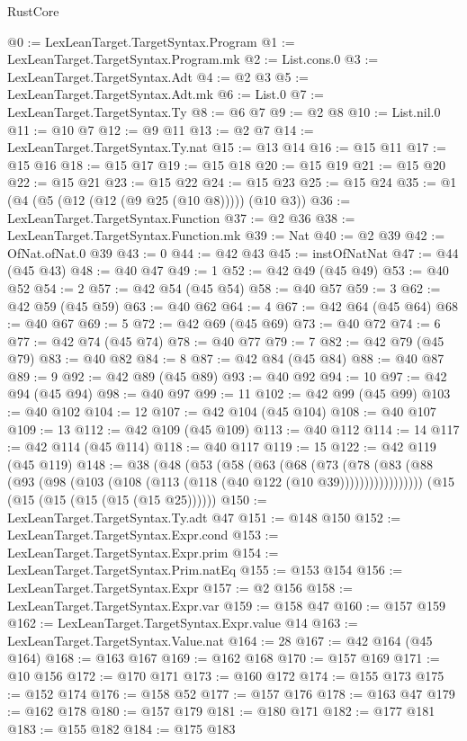 \begin{lexlean}{RustCore}
\begin{coremodule}
@0 := LexLeanTarget.TargetSyntax.Program
@1 := LexLeanTarget.TargetSyntax.Program.mk
@2 := List.cons.{0}
@3 := LexLeanTarget.TargetSyntax.Adt
@4 := @2 @3
@5 := LexLeanTarget.TargetSyntax.Adt.mk
@6 := List.{0}
@7 := LexLeanTarget.TargetSyntax.Ty
@8 := @6 @7
@9 := @2 @8
@10 := List.nil.{0}
@11 := @10 @7
@12 := @9 @11
@13 := @2 @7
@14 := LexLeanTarget.TargetSyntax.Ty.nat
@15 := @13 @14
@16 := @15 @11
@17 := @15 @16
@18 := @15 @17
@19 := @15 @18
@20 := @15 @19
@21 := @15 @20
@22 := @15 @21
@23 := @15 @22
@24 := @15 @23
@25 := @15 @24
@35 := @1 (@4 (@5 (@12 (@12 (@9 @25 (@10 @8))))) (@10 @3))
@36 := LexLeanTarget.TargetSyntax.Function
@37 := @2 @36
@38 := LexLeanTarget.TargetSyntax.Function.mk
@39 := Nat
@40 := @2 @39
@42 := OfNat.ofNat.{0} @39
@43 := 0
@44 := @42 @43
@45 := instOfNatNat
@47 := @44 (@45 @43)
@48 := @40 @47
@49 := 1
@52 := @42 @49 (@45 @49)
@53 := @40 @52
@54 := 2
@57 := @42 @54 (@45 @54)
@58 := @40 @57
@59 := 3
@62 := @42 @59 (@45 @59)
@63 := @40 @62
@64 := 4
@67 := @42 @64 (@45 @64)
@68 := @40 @67
@69 := 5
@72 := @42 @69 (@45 @69)
@73 := @40 @72
@74 := 6
@77 := @42 @74 (@45 @74)
@78 := @40 @77
@79 := 7
@82 := @42 @79 (@45 @79)
@83 := @40 @82
@84 := 8
@87 := @42 @84 (@45 @84)
@88 := @40 @87
@89 := 9
@92 := @42 @89 (@45 @89)
@93 := @40 @92
@94 := 10
@97 := @42 @94 (@45 @94)
@98 := @40 @97
@99 := 11
@102 := @42 @99 (@45 @99)
@103 := @40 @102
@104 := 12
@107 := @42 @104 (@45 @104)
@108 := @40 @107
@109 := 13
@112 := @42 @109 (@45 @109)
@113 := @40 @112
@114 := 14
@117 := @42 @114 (@45 @114)
@118 := @40 @117
@119 := 15
@122 := @42 @119 (@45 @119)
@148 := @38
    (@48
      (@53
        (@58
          (@63
            (@68
              (@73
                (@78 (@83 (@88 (@93 (@98 (@103 (@108 (@113 (@118 (@40 @122 (@10 @39)))))))))))))))))
    (@15 (@15 (@15 (@15 (@15 (@15 @25))))))
@150 := LexLeanTarget.TargetSyntax.Ty.adt @47
@151 := @148 @150
@152 := LexLeanTarget.TargetSyntax.Expr.cond
@153 := LexLeanTarget.TargetSyntax.Expr.prim
@154 := LexLeanTarget.TargetSyntax.Prim.natEq
@155 := @153 @154
@156 := LexLeanTarget.TargetSyntax.Expr
@157 := @2 @156
@158 := LexLeanTarget.TargetSyntax.Expr.var
@159 := @158 @47
@160 := @157 @159
@162 := LexLeanTarget.TargetSyntax.Expr.value @14
@163 := LexLeanTarget.TargetSyntax.Value.nat
@164 := 28
@167 := @42 @164 (@45 @164)
@168 := @163 @167
@169 := @162 @168
@170 := @157 @169
@171 := @10 @156
@172 := @170 @171
@173 := @160 @172
@174 := @155 @173
@175 := @152 @174
@176 := @158 @52
@177 := @157 @176
@178 := @163 @47
@179 := @162 @178
@180 := @157 @179
@181 := @180 @171
@182 := @177 @181
@183 := @155 @182
@184 := @175 @183

\end{coremodule}
\end{lexlean}
